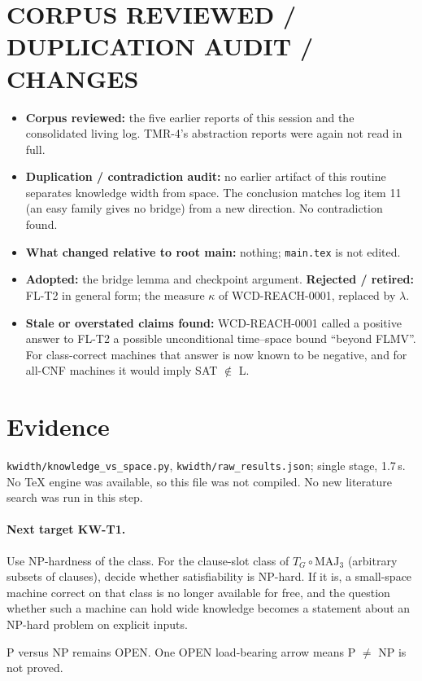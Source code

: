 \documentclass[11pt]{article}
\begin{document}
\section{CORPUS REVIEWED / DUPLICATION AUDIT / CHANGES}
\begin{itemize}
\item \textbf{Corpus reviewed:} the five earlier reports of this session and the consolidated living log. TMR-4's abstraction reports were again not read in full.
\item \textbf{Duplication / contradiction audit:} no earlier artifact of this routine separates knowledge width from space. The conclusion matches log item 11 (an easy family gives no bridge) from a new direction. No contradiction found.
\item \textbf{What changed relative to root main:} nothing; \texttt{main.tex} is not edited.
\item \textbf{Adopted:} the bridge lemma and checkpoint argument. \textbf{Rejected / retired:} FL-T2 in general form; the measure $\kappa$ of WCD-REACH-0001, replaced by $\lambda$.
\item \textbf{Stale or overstated claims found:} WCD-REACH-0001 called a positive answer to FL-T2 a possible unconditional time--space bound ``beyond FLMV''. For class-correct machines that answer is now known to be negative, and for all-CNF machines it would imply SAT $\notin$ L.
\end{itemize}

\section{Evidence}
\texttt{kwidth/knowledge\_vs\_space.py}, \texttt{kwidth/raw\_results.json}; single stage, 1.7\,s. No TeX engine was available, so this file was not compiled. No new literature search was run in this step.

\paragraph{Next target KW-T1.} Use NP-hardness of the class. For the clause-slot class of $T_G\circ\mathrm{MAJ}_3$ (arbitrary subsets of clauses), decide whether satisfiability is NP-hard. If it is, a small-space machine correct on that class is no longer available for free, and the question whether such a machine can hold wide knowledge becomes a statement about an NP-hard problem on explicit inputs.

\medskip\noindent P versus NP remains OPEN. One OPEN load-bearing arrow means P $\ne$ NP is not proved.
\end{document}
